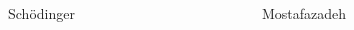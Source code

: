 \documentclass[9pt]{beamer}
\begin{document}
\begin{frame}
\begin{columns}
\begin{column}{.49\textwidth}
\begin{block}{Schödinger}
\end{block}
\end{column}
\begin{column}{.49\textwidth}
\begin{block}{Mostafazadeh}
\end{block}
\end{column}
\end{columns}
\end{frame}
\end{document}
